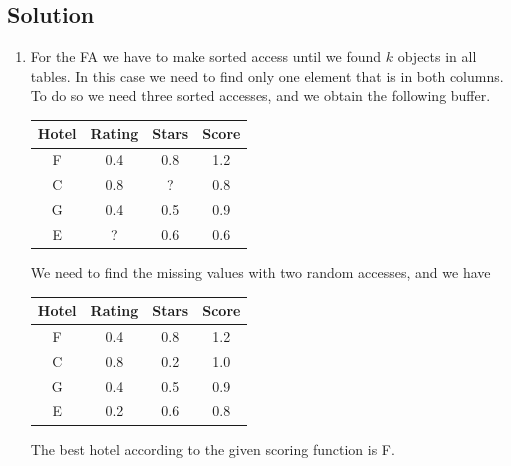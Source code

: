 \documentclass[12pt, a4paper]{report}
\begin{document}
    \subsection*{Solution}
        \begin{enumerate}
            \item For the FA we have to make sorted access until we found $k$ objects in all tables. 
                In this case we need to find only one element that is in both columns. To do so we need 
                three sorted accesses, and we obtain the following buffer. 
                \begin{table}[H]
                    \centering
                    \begin{tabular}{c|cc|c}
                    \hline
                    \textbf{Hotel} & \textbf{Rating} & \textbf{Stars} & \textbf{Score} \\ \hline
                    F     & 0.4    & 0.8   & 1.2   \\
                    C     & 0.8    & ?     & 0.8   \\
                    G     & 0.4    & 0.5   & 0.9   \\
                    E     & ?      & 0.6   & 0.6   \\ \hline
                    \end{tabular}
                \end{table}
                We need to find the missing values with two random accesses, and we have
                \begin{table}[H]
                    \centering
                    \begin{tabular}{c|cc|c}
                    \hline
                    \textbf{Hotel} & \textbf{Rating} & \textbf{Stars} & \textbf{Score} \\ \hline
                    F     & 0.4    & 0.8   & 1.2   \\
                    C     & 0.8    & 0.2   & 1.0   \\
                    G     & 0.4    & 0.5   & 0.9   \\
                    E     & 0.2    & 0.6   & 0.8   \\ \hline
                    \end{tabular}
                \end{table}
                The best hotel according to the given scoring function is F. 


\end{enumerate}
\end{document}
